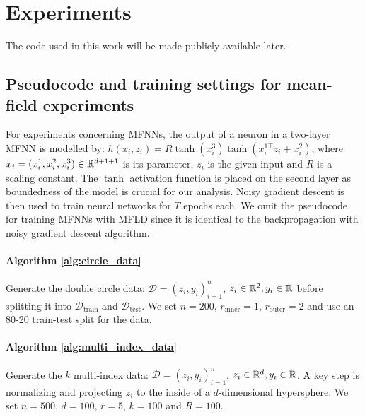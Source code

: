 \section{Experiments}\label{sec:experiments_extra}
The code used in this work will be made publicly available later.

\subsection{Pseudocode and training settings for mean-field experiments} \label{subsec:pseudocode}

For experiments concerning MFNNs, the output of a neuron in a two-layer MFNN is modelled by: $h(x_i, z_i) = R\tanh(x_i^3) \tanh(x_i^{1\top} z_i + x_i^2)$, where $x_i = (x_i^1, x_i^2, x_i^3) \in \mathbb{R}^{d + 1 + 1}$ is its parameter, $z_i$ is the given input and $R$ is a scaling constant. The $\tanh$ activation function is placed on the second layer as boundedness of the model is crucial for our analysis. Noisy gradient descent is then used to train neural networks for $T$ epochs each. We omit the pseudocode for training MFNNs with MFLD since it is identical to the backpropagation with noisy gradient descent algorithm.

\paragraph{Algorithm \ref{alg:circle_data}} Generate the double circle data: $\mathcal{D} = \left( z_i, y_i\right)^n_{i=1}$, $z_i \in \mathbb{R}^2, y_i \in \mathbb{R}$ before splitting it into $\mathcal{D}_\text{train}$ and $\mathcal{D}_{\text{test}}$. We set $n=200$, $r_\text{inner}=1$, $r_\text{outer}=2$ and use an 80-20 train-test split for the data.

\paragraph{Algorithm \ref{alg:multi_index_data}} Generate the $k$ multi-index data: $\mathcal{D} = \left( z_i, y_i\right)^n_{i=1}$, $z_i \in \mathbb{R}^d, y_i \in \mathbb{R}$. A key step is normalizing and projecting $z_i$ to the inside of a $d$-dimensional hypersphere. We set $n = 500$, $d = 100$, $r=5$, $k=100$ and $\bar{R} = 100$. 

